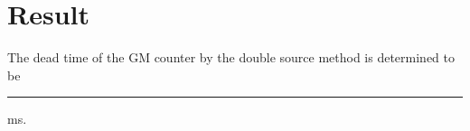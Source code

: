 \documentclass[12pt,a4paper]{article}
\begin{document}
	
	\begin{comment}
		\section{Python Code}
		\begin{lstlisting}
		print "Define the time (in seconds) during which the count is taken: "
		t = input(" ")	# The total time during which the counts are recorded
		t1 = t 
		t2 = t
		
		def meanc(i):	# A Function to calculate the mean count rate from two given counts
		while i==1:
		
		print "TRIAL No. 1\n"
		c1 = float(input("Enter count: "))
		
		n1 = c1/t1
		
		print "\nTRIAL No. 2\n"
		c2 = float(input("Enter count: "))
		
		n2 = c2/t2
		
		n = (n1+n2)/2
		
		return n
		
		print "__________FIRST SOURCE ALONE__________"
		
		n1 = meanc(1)
		print "\nThe mean count rate of first source alone is ",n1,"\n"
		
		print "__________FIRST & SECOND SOURCE TOGETHER__________"
		
		n12 = meanc(1)
		print "\nThe mean count rate of first and second source together is ",n12,"\n"
		
		print "__________SECOND SOURCE ALONE__________"
		
		n2 = meanc(1)
		print "\nThe mean count rate of second source alone is ",n2,"\n"
		
		print "\n__________DEAD TIME__________\n"
		
		T = (n1 + n2 - n12)/(2*n1*n2)
		
		print "The dead time is calculated to be: ",T," seconds"
		
		print "\nThe dead time is determined to be: ",T*1000," milliseconds"
		
		\end{lstlisting}
		
	\end{comment}		
	
	\section{Result}
	
		The dead time of the GM counter by the double source method is determined to be \rule{20ex}{0.2pt}ms.
\end{document}
